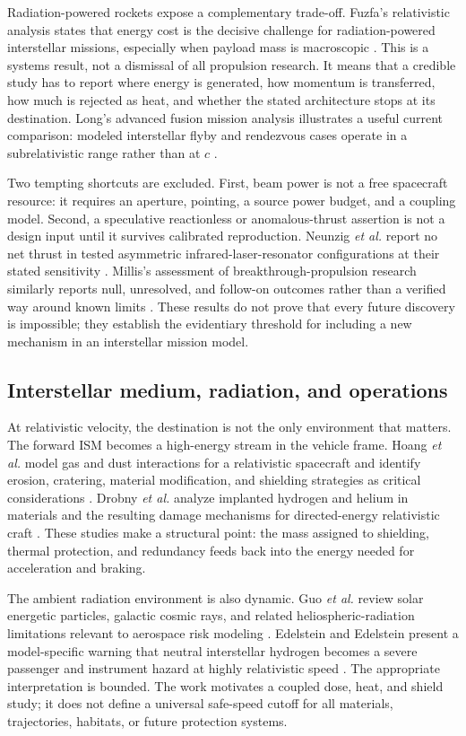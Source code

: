 \documentclass[conference]{../../../../Conference-LaTeX-template_10-17-19/IEEEtran}
\begin{document}
Radiation-powered rockets expose a complementary trade-off. Fuzfa's relativistic analysis states that energy cost is the decisive challenge for radiation-powered interstellar missions, especially when payload mass is macroscopic \cite{fuzfa2019}. This is a systems result, not a dismissal of all propulsion research. It means that a credible study has to report where energy is generated, how momentum is transferred, how much is rejected as heat, and whether the stated architecture stops at its destination. Long's advanced fusion mission analysis illustrates a useful current comparison: modeled interstellar flyby and rendezvous cases operate in a subrelativistic range rather than at $c$ \cite{long2022}.

Two tempting shortcuts are excluded. First, beam power is not a free spacecraft resource: it requires an aperture, pointing, a source power budget, and a coupling model. Second, a speculative reactionless or anomalous-thrust assertion is not a design input until it survives calibrated reproduction. Neunzig \textit{et al.} report no net thrust in tested asymmetric infrared-laser-resonator configurations at their stated sensitivity \cite{neunzig2021}. Millis's assessment of breakthrough-propulsion research similarly reports null, unresolved, and follow-on outcomes rather than a verified way around known limits \cite{millis2005}. These results do not prove that every future discovery is impossible; they establish the evidentiary threshold for including a new mechanism in an interstellar mission model.

\subsection{Interstellar medium, radiation, and operations}
At relativistic velocity, the destination is not the only environment that matters. The forward ISM becomes a high-energy stream in the vehicle frame. Hoang \textit{et al.} model gas and dust interactions for a relativistic spacecraft and identify erosion, cratering, material modification, and shielding strategies as critical considerations \cite{hoang2017}. Drobny \textit{et al.} analyze implanted hydrogen and helium in materials and the resulting damage mechanisms for directed-energy relativistic craft \cite{droby2021}. These studies make a structural point: the mass assigned to shielding, thermal protection, and redundancy feeds back into the energy needed for acceleration and braking.

The ambient radiation environment is also dynamic. Guo \textit{et al.} review solar energetic particles, galactic cosmic rays, and related heliospheric-radiation limitations relevant to aerospace risk modeling \cite{guo2024}. Edelstein and Edelstein present a model-specific warning that neutral interstellar hydrogen becomes a severe passenger and instrument hazard at highly relativistic speed \cite{edl2012}. The appropriate interpretation is bounded. The work motivates a coupled dose, heat, and shield study; it does not define a universal safe-speed cutoff for all materials, trajectories, habitats, or future protection systems.
\end{document}
